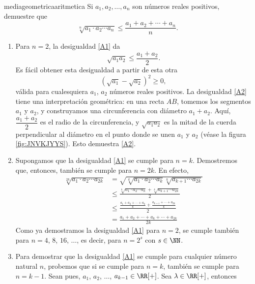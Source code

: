 \newpage

\begin{examplebox}{}{mediageometricaaritmetica}
    Si $a_1, a_2, \dots, a_n$ son números reales positivos, demuestre que
    \begin{equation}
        \sqrt[n]{a_1\cdot a_2 \cdots a_n} \leq \frac{a_1+a_2+\cdots +a_n}{n}. \label{A1}
    \end{equation}

    \tcblower
    \demostracion 
    \begin{enumerate}[label=\roman*., topsep=6pt, itemsep=0pt]
        \item Para $n = 2$, la desigualdad \eqref{A1} da
        \begin{equation}
            \sqrt{a_1a_2} \leq \frac{a_1+a_2}{2}. \label{A2}
        \end{equation}
        Es fácil obtener esta desigualdad a partir de esta otra
        $$\left( \sqrt{a_1} - \sqrt{a_2} \right)^2 \geq 0,$$
        válida para cualesquiera $a_1$, $a_2$ números reales positivos. La desigualdad \eqref{A2} tiene una interpretación geométrica: en una recta $AB$, tomemos los segmentos $a_1$ y $a_2$, y construyamos una circunferencia con diámetro $a_1 + a_2$. Aquí, $\dfrac{a_1 + a_2}{2}$ es el radio de la circunferencia, y $\sqrt{a_1a_2}$ es la mitad de la cuerda perpendicular al diámetro en el punto donde se unen $a_1$ y $a_2$ (véase la figura \ref{fig:JNVKJYYS}). Esto demuestra \eqref{A2}.
        \item Supongamos que la desigualdad \eqref{A1} se cumple para $n = k$. Demostremos que, entonces, también se cumple para $n = 2k$. En efecto,
        \begin{align*}
            \sqrt[2k]{a_1\cdot a_2 \cdots a_{2k}} & = \sqrt{\sqrt[k]{a_1 \cdot a_2 \cdots a_k}\sqrt[k]{a_{k+1} \cdots a_{2k}}} \\
            & \leq \frac{\sqrt[k]{a_1 \cdot a_2 \cdots a_k} + \sqrt[k]{a_{k+1} \cdots a_{2k}}}{2} \\
            & \leq \displaystyle\frac{\displaystyle\frac{a_1+a_2+\cdots +a_k}{k} +\displaystyle\frac{a_{k+1}+\cdots+a_{2k}}{k}}{2} \\
            & = \frac{a_1+a_2+\cdots+a_k+\cdots+a_{2k}}{2k}
        \end{align*}
        Como ya demostramos la desigualdad \eqref{A1} para $n = 2$, se cumple también para $n = 4$, $8$, $16$, $\dots$, es decir, para $n = 2^s$ con $s \in \NN$.
        \item Para demostrar que la desigualdad \eqref{A1} se cumple para cualquier número natural $n$, probemos que si se cumple para $n = k$, también se cumple para $n = k-1$. Sean pues, $a_1$, $a_2$, $\dots$, $a_{k-1} \in \RR[+]$. Sea $\lambda \in \RR[+]$, entonces

\end{enumerate}
\end{examplebox}
